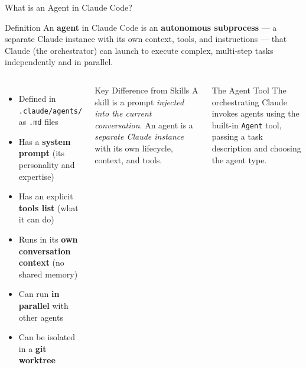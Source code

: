 \documentclass[aspectratio=169,xcolor=dvipsnames]{beamer}
\begin{document}
\begin{frame}{What is an Agent in Claude Code?}
    \begin{block}{Definition}
        An \textbf{agent} in Claude Code is an \textbf{autonomous subprocess} --- a separate Claude instance with its own context, tools, and instructions --- that Claude (the orchestrator) can launch to execute complex, multi-step tasks independently and in parallel.
    \end{block}

    \begin{columns}
        \begin{itemize}
            \item Defined in \texttt{.claude/agents/} as \texttt{.md} files
            \item Has a \textbf{system prompt} (its personality and expertise)
            \item Has an explicit \textbf{tools list} (what it can do)
            \item Runs in its \textbf{own conversation context} (no shared memory)
            \item Can run \textbf{in parallel} with other agents
            \item Can be isolated in a \textbf{git worktree}
        \end{itemize}

        \begin{alertblock}{Key Difference from Skills}
            A skill is a prompt \emph{injected into the current conversation}. An agent is a \emph{separate Claude instance} with its own lifecycle, context, and tools.
        \end{alertblock}
        \vspace{0.2cm}
        \begin{exampleblock}{The Agent Tool}
            The orchestrating Claude invokes agents using the built-in \texttt{Agent} tool, passing a task description and choosing the agent type.
        \end{exampleblock}
    \end{columns}
\end{frame}
\end{document}
